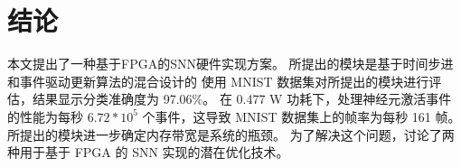 


\chapter{结论}

本文提出了一种基于FPGA的SNN硬件实现方案。
所提出的模块是基于时间步进和事件驱动更新算法的混合设计的
使用 MNIST 数据集对所提出的模块进行评估，结果显示分类准确度为 97.06\%。
在 0.477 W 功耗下，处理神经元激活事件的性能为每秒 $6.72*10^5$ 个事件，这导致 MNIST 数据集上的帧率为每秒 161 帧。
所提出的模块进一步确定内存带宽是系统的瓶颈。 
为了解决这个问题，讨论了两种用于基于 FPGA 的 SNN 实现的潜在优化技术。
